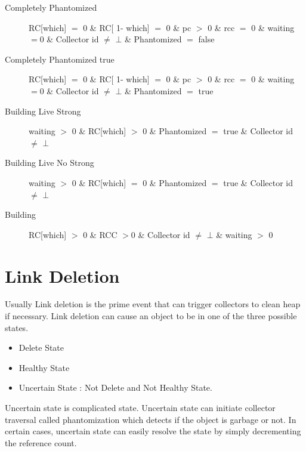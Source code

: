 \documentclass{article}
\begin{document}
\begin{description}
\item[Completely Phantomized] RC[which] $=$ 0 \& RC[ 1- which] $=$ 0 \& pc $>$ 0 \& rcc $=$ 0 \& waiting $=$0 \& Collector id $\neq$ $\bot$ \& Phantomized $=$ false
\item[Completely Phantomized true] RC[which] $=$ 0 \& RC[ 1- which] $=$ 0 \& pc $>$ 0 \& rcc $=$ 0 \& waiting $=$0 \& Collector id $\neq$ $\bot$ \& Phantomized $=$ true
\item[Building Live Strong] waiting $>$ 0 \& RC[which] $>$ 0 \& Phantomized $=$ true \& Collector id $\neq$ $\bot$
\item[Building Live No Strong] waiting $>$ 0 \& RC[which] $=$ 0 \& Phantomized $=$ true \& Collector id $\neq$ $\bot$
   \item[Building] RC[which] $>$ 0 \& RCC $>$0 \& Collector id $\neq$ $\bot$ \& waiting $>$ 0

\end{description}
\section{Link Deletion}
	Usually Link deletion is the prime event that can trigger collectors to clean heap if necessary. Link deletion can cause an object to be in one of the three possible states. 
\begin{itemize}
  \item Delete State
  \item Healthy State
  \item Uncertain State : Not Delete and Not Healthy State.
\end{itemize}
	Uncertain state is complicated state. Uncertain state can initiate collector traversal called phantomization which detects if the object is garbage or not. In certain cases, uncertain state can easily resolve the state by simply decrementing the reference count. 
\end{document}
